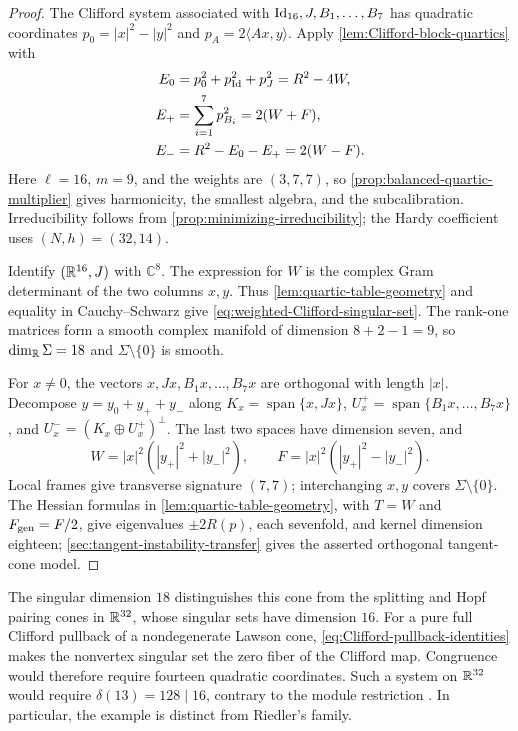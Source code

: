 \begin{proof}
The Clifford system associated with $\operatorname{Id}_{16},J,B_1,\ldots,B_7$
has quadratic coordinates $p_0=|x|^2-|y|^2$ and
$p_A=2\langle Ax,y\rangle$. Apply \cref{lem:Clifford-block-quartics} with
\begin{align}
 E_0&=p_0^2+p_{\operatorname{Id}}^2+p_J^2=R^2-4W,\nonumber\\
 E_+&=\sum_{i=1}^7p_{B_i}^2=2(W+F),\label{eq:weighted-Clifford-blocks}\\
 E_-&=R^2-E_0-E_+=2(W-F).\nonumber
\end{align}
Here $\ell=16$, $m=9$, and the weights are $(3,7,7)$, so
\cref{prop:balanced-quartic-multiplier} gives harmonicity, the smallest
algebra, and the subcalibration. Irreducibility follows from
\cref{prop:minimizing-irreducibility}; the Hardy coefficient uses
$(N,h)=(32,14)$.

Identify $(\mathbb R^{16},J)$ with $\mathbb C^8$.  The expression for
$W$ is the complex Gram determinant of the two columns $x,y$.
Thus \cref{lem:quartic-table-geometry} and equality in Cauchy--Schwarz
give \eqref{eq:weighted-Clifford-singular-set}.
The rank-one matrices form a smooth complex manifold of dimension
$8+2-1=9$, so $\dim_{\mathbb R}\Sigma=18$ and
$\Sigma\setminus\{0\}$ is smooth.

For $x\ne0$, the vectors $x,Jx,B_1x,\ldots,B_7x$ are orthogonal
with length $|x|$. Decompose $y=y_0+y_++y_-$ along
$K_x=\operatorname{span}\{x,Jx\}$,
$U_x^+=\operatorname{span}\{B_1x,\ldots,B_7x\}$, and
$U_x^-=(K_x\oplus U_x^+)^\perp$. The last two spaces have dimension seven, and
\begin{equation}\label{eq:weighted-Clifford-transverse-form}
 W=|x|^2(|y_+|^2+|y_-|^2),\qquad
 F=|x|^2(|y_+|^2-|y_-|^2).
\end{equation}
Local frames give transverse signature $(7,7)$; interchanging $x,y$
covers $\Sigma\setminus\{0\}$. The Hessian formulas in
\cref{lem:quartic-table-geometry}, with $T=W$ and $F_{\rm gen}=F/2$,
give eigenvalues $\pm2R(p)$, each sevenfold, and kernel dimension
eighteen; \cref{sec:tangent-instability-transfer} gives the asserted
orthogonal tangent-cone model.
\end{proof}

The singular dimension $18$ distinguishes this cone from the
splitting and Hopf pairing cones in $\mathbb R^{32}$, whose singular sets
have dimension $16$. For a pure full Clifford pullback of a
nondegenerate Lawson cone, \eqref{eq:Clifford-pullback-identities}
makes the nonvertex singular set the zero fiber of the Clifford map.
Congruence would therefore require fourteen quadratic coordinates.
Such a system on $\mathbb R^{32}$ would require $\delta(13)=128\mid16$,
contrary to the module restriction \cite[Section~3.5]{FKM81}.
In particular, the example is distinct from Riedler's family.
